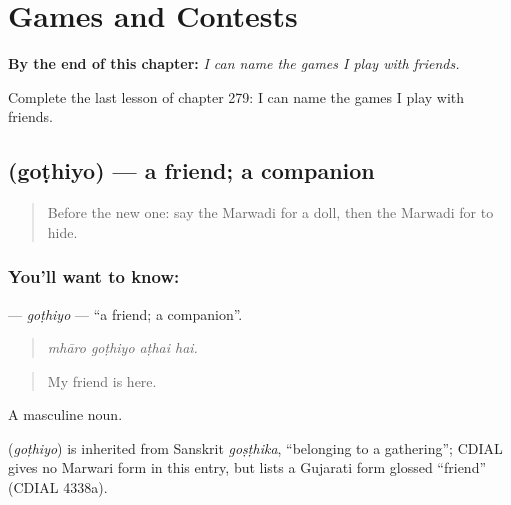 
\chapter{Games and Contests}
\label{ch:mw-games-and-contests}

\begin{chapteropening}
\textbf{By the end of this chapter:} \emph{I can name the games I play with friends.}

Complete the last lesson of chapter 279: I can name the games I play with friends.
\end{chapteropening}

\section[\texorpdfstring{\mw{गोठियो} (goṭhiyo)}{गोठियो (goṭhiyo)}]{ (goṭhiyo) — a friend; a companion}

\label{lesson:MW-C279-gothiyo}



\begin{quote}
Before the new one: say the Marwadi for a doll, then the Marwadi for to hide.
\end{quote}

\subsection*{You'll want to know: }
\textbf{} — \emph{goṭhiyo} — \textquotedblleft{}a friend; a companion\textquotedblright{}.

\begin{quote}
   
\end{quote}

\begin{quote}
\emph{mhāro goṭhiyo aṭhai hai.}
\end{quote}

\begin{quote}
My friend is here.
\end{quote}

A masculine noun.

\begin{cousinweb}
\textbf{} (\emph{goṭhiyo}) is inherited from Sanskrit \emph{goṣṭhika}, \textquotedblleft{}belonging to a gathering\textquotedblright{}; CDIAL gives no Marwari form in this entry, but lists a Gujarati form glossed \textquotedblleft{}friend\textquotedblright{} (CDIAL 4338a).
\end{cousinweb}

